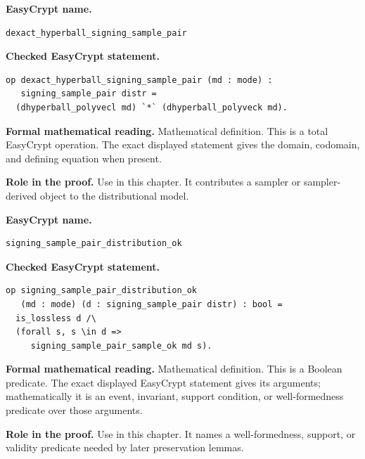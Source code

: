 \begin{formaldefinition}
\noindent\textbf{EasyCrypt name.}
\begin{lstlisting}[language=EasyCrypt,basicstyle=\ttfamily\scriptsize]
dexact_hyperball_signing_sample_pair
\end{lstlisting}
\noindent\textbf{Checked EasyCrypt statement.}
\begin{lstlisting}[language=EasyCrypt,basicstyle=\ttfamily\scriptsize]
op dexact_hyperball_signing_sample_pair (md : mode) :
   signing_sample_pair distr =
  (dhyperball_polyvecl md) `*` (dhyperball_polyveck md).
\end{lstlisting}
\noindent\textbf{Formal mathematical reading.}
Mathematical definition. This is a total EasyCrypt operation.  The exact displayed statement gives the domain, codomain, and defining equation when present.

\noindent\textbf{Role in the proof.}
Use in this chapter. It contributes a sampler or sampler-derived object to the distributional model.

\end{formaldefinition}

\begin{formaldefinition}
\noindent\textbf{EasyCrypt name.}
\begin{lstlisting}[language=EasyCrypt,basicstyle=\ttfamily\scriptsize]
signing_sample_pair_distribution_ok
\end{lstlisting}
\noindent\textbf{Checked EasyCrypt statement.}
\begin{lstlisting}[language=EasyCrypt,basicstyle=\ttfamily\scriptsize]
op signing_sample_pair_distribution_ok
   (md : mode) (d : signing_sample_pair distr) : bool =
  is_lossless d /\
  (forall s, s \in d =>
     signing_sample_pair_sample_ok md s).
\end{lstlisting}
\noindent\textbf{Formal mathematical reading.}
Mathematical definition. This is a Boolean predicate.  The exact displayed EasyCrypt statement gives its arguments; mathematically it is an event, invariant, support condition, or well-formedness predicate over those arguments.

\noindent\textbf{Role in the proof.}
Use in this chapter. It names a well-formedness, support, or validity predicate needed by later preservation lemmas.

\end{formaldefinition}

